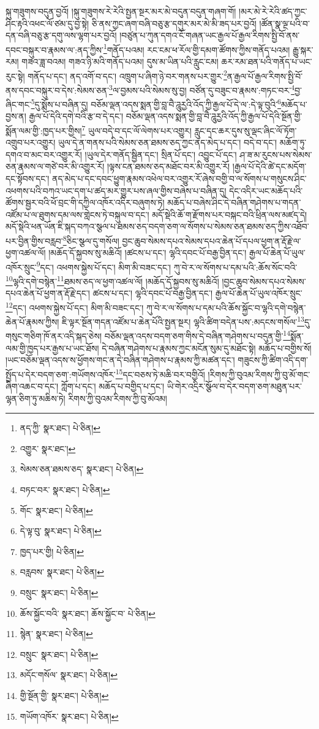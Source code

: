 སྐུ་གཟུགས་བདུན་བྱའོ། །སྐུ་གཟུགས་རེ་རེའི་སྤྱན་སྔར་མར་མེ་བདུན་བདུན་གཞག་གོ། །མར་མེ་རེ་རེའི་ཚད་ཀྱང་ཤིང་རྟའི་འཕང་ལོ་ཙམ་དུ་བྱ་སྟེ། ཅི་ནས་ཀྱང་ཞག་བཞི་བཅུ་རྩ་དགུར་མར་མེ་མི་ཟད་པར་བྱའོ། །ཚོན་སྣ་ལྔ་པའི་བ་དན་བཞི་བཅུ་རྩ་དགུ་ལས་ལྷག་པར་བྱའོ། །བཙུན་པ་ཀུན་དགའ་ངོ་གཞན་ཡང་རྒྱལ་པོ་རྒྱལ་རིགས་སྤྱི་བོ་ནས་དབང་བསྐུར་བ་རྣམས་ལ་:ནད་ཀྱིས་\footnote{ནད་ཀྱི་  སྣར་ཐང་།  པེ་ཅིན། }གནོད་པའམ། རང་ངམ་ཕ་རོལ་གྱི་དམག་ཚོགས་ཀྱིས་གནོད་པའམ། རྒྱུ་སྐར་རམ། གཟའ་ཟླ་བའམ། གཟའ་ཉི་མའི་གནོད་པའམ། དུས་མ་ཡིན་པའི་རླུང་ངམ། ཆར་རམ་ཐན་པའི་གནོད་པ་ཡང་རུང་སྟེ། གནོད་པ་དང་། ནད་འགོ་བ་དང་། འཁྲུག་པ་ཞིག་ཉེ་བར་གནས་པར་གྱུར་\footnote{འགྱུར་  སྣར་ཐང་། }ན་རྒྱལ་པོ་རྒྱལ་རིགས་སྤྱི་བོ་ནས་དབང་བསྐུར་བ་དེས་:སེམས་ཅན་\footnote{སེམས་ཅན་ཐམས་ཅད་  སྣར་ཐང་།  པེ་ཅིན། }ལ་བྱམས་པའི་སེམས་སུ་བྱ། བཙོན་དུ་བཟུང་བ་རྣམས་:གཏང་བར་\footnote{བཏང་བར་  སྣར་ཐང་།  པེ་ཅིན། }བྱ་ཞིང་གང་\footnote{གོང་  སྣར་ཐང་།  པེ་ཅིན། }དུ་སྨོས་པ་བཞིན་དུ། བཅོམ་ལྡན་འདས་སྨན་གྱི་བླ་བཻ་ཌཱུརྱའི་འོད་ཀྱི་རྒྱལ་པོ་དེ་ལ་:དེ་ལྟ་བུའི་\footnote{དེ་ལྟ་བུ་  སྣར་ཐང་།  པེ་ཅིན། }མཆོད་པ་བྱས་ན། རྒྱལ་པོ་དེའི་དགེ་བའི་རྩ་བ་དེ་དང་། བཅོམ་ལྡན་འདས་སྨན་གྱི་བླ་བཻ་ཌཱུརྱའི་འོད་ཀྱི་རྒྱལ་པོ་དེའི་སྔོན་གྱི་སྨོན་ལམ་གྱི་:ཁྱད་པར་གྱིས།\footnote{ཁྱད་པར་གྱི།  པེ་ཅིན། } ཡུལ་བདེ་བ་དང་ལོ་ལེགས་པར་འགྱུར། རླུང་དང་ཆར་དུས་སུ་ལྡང་ཞིང་ལོ་ཏོག་འགྲུབ་པར་འགྱུར། ཡུལ་དེ་ན་གནས་པའི་སེམས་ཅན་ཐམས་ཅད་ཀྱང་ནད་མེད་པ་དང་། བདེ་བ་དང་། མཆོག་ཏུ་དགའ་བ་མང་བར་འགྱུར་རོ། །ཡུལ་དེར་གནོད་སྦྱིན་དང་། སྲིན་པོ་དང་། འབྱུང་པོ་དང་། ཤ་ཟ་མ་རུངས་པས་སེམས་ཅན་རྣམས་ལ་གཙེ་བར་མི་འགྱུར་རོ། །ལྟས་ངན་ཐམས་ཅད་མཐོང་བར་མི་འགྱུར་རོ། །རྒྱལ་པོ་དེའི་ཚེ་དང་མདོག་དང་སྟོབས་དང་། ནད་མེད་པ་དང་དབང་ཕྱུག་རྣམས་འཕེལ་བར་འགྱུར་རོ་ཞེས་བགྱི་བ་ལ་སོགས་པ་གསུངས་ཤིང་འཕགས་པའི་བཀའ་ཡང་དག་པ་ཚད་མར་གྱུར་པས་ཞལ་གྱིས་བཞེས་པ་བཞིན་དུ། དེང་འདིར་ཡང་མཆོད་པའི་ཚོགས་སྦྱར་བའི་ཕོ་བྲང་གི་དཀྱིལ་འཁོར་འདིར་བཞུགས་ཏེ། མཆོད་པ་བཞེས་ཤིང་དེ་བཞིན་གཤེགས་པ་གདན་འཛོམ་པ་ལ་ཐུགས་དམ་ལས་གླེངས་ཏེ་བསྐུལ་བ་དང་། མདོ་སྡེའི་ཆོ་ག་རྫོགས་པར་བསྐང་བའི་ཕྲིན་ལས་མཛད་དེ། མདོ་སྡེའི་ཕན་ཡོན་ཇི་སྐད་བཀའ་སྩལ་པ་ཐམས་ཅད་བདག་ཅག་ལ་སོགས་པ་སེམས་ཅན་ཐམས་ཅད་ཀྱིས་འཐོབ་པར་བྱིན་གྱིས་བརླབ་\footnote{བརླབས་  སྣར་ཐང་།  པེ་ཅིན། }ཅིང་སྩལ་དུ་གསོལ། བྱང་ཆུབ་སེམས་དཔའ་སེམས་དཔའ་ཆེན་པོ་དཔལ་ཕྱག་ན་རྡོ་རྗེ་ལ་ཕྱག་འཚལ་ལོ། །མཆོད་དོ་སྐྱབས་སུ་མཆིའོ། །ཚངས་པ་དང་། ལྷའི་དབང་པོ་བརྒྱ་བྱིན་དང་། རྒྱལ་པོ་ཆེན་པོ་ཡུལ་འཁོར་སྲུང་\footnote{བསྲུང་  སྣར་ཐང་།  པེ་ཅིན། }དང་། འཕགས་སྐྱེས་པོ་དང་། མིག་མི་བཟང་དང་། ཀུ་བེ་ར་ལ་སོགས་པ་དམ་པའི་:ཆོས་སོང་བའི་\footnote{ཆོས་སྐྱོང་བའི་  སྣར་ཐང་། ཆོས་སྐྱོང་བ་  པེ་ཅིན། }ལྷའི་དགེ་བསྙེན་\footnote{སྙེན་  སྣར་ཐང་།  པེ་ཅིན། }ཐམས་ཅད་ལ་ཕྱག་འཚལ་ལོ། །མཆོད་དོ་སྐྱབས་སུ་མཆིའོ། །བྱང་ཆུབ་སེམས་དཔའ་སེམས་དཔའ་ཆེན་པོ་ཕྱག་ན་རྡོ་རྗེ་དང་། ཚངས་པ་དང་། ལྷའི་དབང་པོ་བརྒྱ་བྱིན་དང་། རྒྱལ་པོ་ཆེན་པོ་ཡུལ་འཁོར་སྲུང་\footnote{བསྲུང་  སྣར་ཐང་།  པེ་ཅིན། }དང་། འཕགས་སྐྱེས་པོ་དང་། མིག་མི་བཟང་དང་། ཀུ་བེ་ར་ལ་སོགས་པ་དམ་པའི་ཆོས་སྐྱོང་བ་ལྷའི་དགེ་བསྙེན་ཆེན་པོ་རྣམས་ཀྱིས། ཇི་ལྟར་སྔོན་གདན་འཛོམ་པ་ཆེན་པོའི་སྤྱན་སྔར། ལྷའི་ཚིག་བདེན་པས་:མདངས་གསོལ་\footnote{མདོང་གསོལ་  སྣར་ཐང་།  པེ་ཅིན། }དུ་གསུང་གཅིག་ཁོ་ནར་འདི་སྐད་ཅེས། བཅོམ་ལྡན་འདས་བདག་ཅག་གིས་དེ་བཞིན་གཤེགས་པ་བདུན་གྱི་\footnote{གྱི་སྔོན་གྱི་  སྣར་ཐང་།  པེ་ཅིན། }སྨོན་ལམ་གྱི་ཁྱད་པར་རྒྱས་པ་ཡང་ཐོས། དེ་བཞིན་གཤེགས་པ་རྣམས་ཀྱང་མངོན་སུམ་དུ་མཐོང་སྟེ། མཆོད་པ་བགྱིས་སོ། །ཡང་བཅོམ་ལྡན་འདས་ས་ཕྱོགས་གང་ན་དེ་བཞིན་གཤེགས་པ་རྣམས་ཀྱི་མཚན་དང་། གཟུངས་ཀྱི་ཚིག་འདི་དག་སྤྱོད་པ་དེར་བདག་ཅག་:གཡོགས་འཁོར་\footnote{གཡོག་འཁོར་  སྣར་ཐང་།  པེ་ཅིན། }དང་བཅས་ཏེ་མཆི་བར་བགྱིའོ། །རིགས་ཀྱི་བུའམ་རིགས་ཀྱི་བུ་མོ་གང་ཞིག་འཆང་བ་དང་། ཀློག་པ་དང་། མཆོད་པ་བགྱིད་པ་དང་། ཡི་གེར་འདྲིར་སྩོལ་བ་དེར་བདག་ཅག་མཐུན་པར་ལྷན་ཅིག་ཏུ་མཆིས་ཏེ། རིགས་ཀྱི་བུའམ་རིགས་ཀྱི་བུ་མོའམ། 